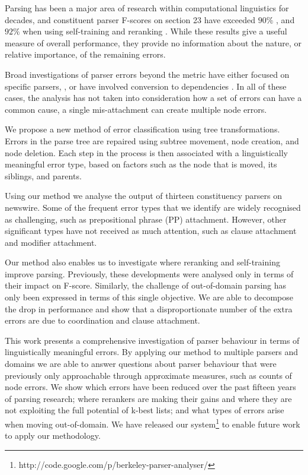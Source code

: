 Parsing has been a major area of research within computational linguistics for
decades, and constituent parser F-scores on \wsj section 23 have exceeded
$90\%$ \parencite{Petrov-Klein:2007}, and $92\%$ when using self-training and
reranking \parencite{McClosky-Charniak-Johnson:2006,Charniak-Johnson:2005}. 
While these results give a useful measure of overall performance, they provide
no information about the nature, or relative importance, of the remaining
errors.

Broad investigations of parser errors beyond the \parseval metric
\parencite{Black-etal:1991} have either focused on specific parsers, \eg
\parencite{Collins:2003}, or have involved conversion to dependencies
\parencite{Carroll-etal:1998,King:2003}.  In all of these cases, the analysis has
not taken into consideration how a set of errors can have a common cause, \eg a
single mis-attachment can create multiple node errors.

We propose a new method of error classification using tree transformations.
Errors in the parse tree are repaired using subtree movement, node
creation, and node deletion.  Each step in the process is then associated with
a linguistically meaningful error type, based on factors such as the node that is
moved, its siblings, and parents.  

Using our method we analyse the output of thirteen constituency parsers on
newswire.  Some of the frequent error types that we identify are widely recognised
as challenging, such as prepositional phrase (PP) attachment.  However, other
significant types have not received as much attention, such as clause
attachment and modifier attachment.

Our method also enables us to investigate where reranking and self-training
improve parsing.  Previously, these developments were analysed only in terms of
their impact on F-score.  Similarly, the challenge of out-of-domain parsing has
only been expressed in terms of this single objective.  We are able to
decompose the drop in performance and show that a disproportionate number of
the extra errors are due to coordination and clause attachment.

This work presents a comprehensive investigation of parser behaviour in terms
of linguistically meaningful errors.  By applying our method to multiple
parsers and domains we are able to answer questions about parser behaviour that
were previously only approachable through approximate measures, such as counts
of node errors.  We show which errors have been reduced over the past fifteen
years of parsing research; where rerankers are making their gains and where
they are not exploiting the full potential of k-best lists; and what types of
errors arise when moving out-of-domain.  We have released our
system\footnote{http://code.google.com/p/berkeley-parser-analyser/} to enable
future work to apply our methodology.

